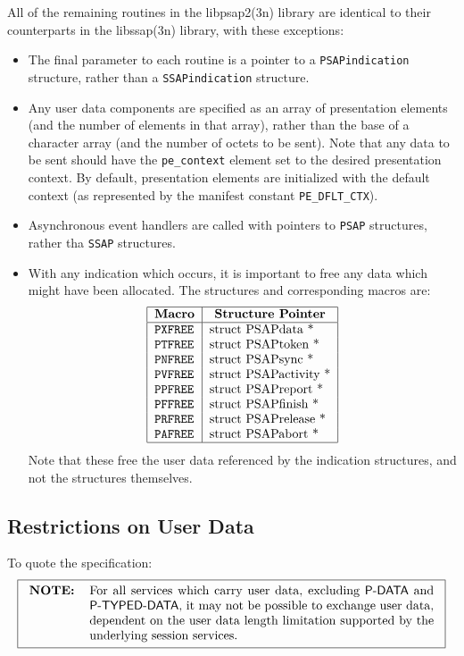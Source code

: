 All of the remaining routines in the \man libpsap2(3n) library are identical
to their counterparts in the \man libssap(3n) library,
with these exceptions:
\begin{itemize}
\item	The final parameter to each routine is a pointer to a
	\verb"PSAPindication" structure,
	rather than a \verb"SSAPindication" structure.

\item	Any user data components are specified as an array of presentation
	elements (and the number of elements in that array),
	rather than the base of a character array (and the number of octets
	to be sent).
	Note that any data to be sent should have the \verb"pe_context"
	element set to the desired presentation context.
	By default, presentation elements are initialized with the
	default context (as represented by the manifest constant
	\verb"PE_DFLT_CTX").

\item	Asynchronous event handlers are called with pointers to \verb"PSAP"
	structures, rather tha \verb"SSAP" structures.

\item	With any indication which occurs,
	it is important to free any data which might have been allocated.
	The structures and corresponding macros are:
\[\begin{tabular}{|l|l|}
\hline
    \multicolumn{1}{|c|}{\bf Macro}&
		\multicolumn{1}{c|}{\bf Structure Pointer}\\
\hline
    \tt	PXFREE&		struct PSAPdata *\\
    \tt	PTFREE&		struct PSAPtoken *\\
    \tt	PNFREE&		struct PSAPsync *\\
    \tt	PVFREE&		struct PSAPactivity *\\
    \tt	PPFREE&		struct PSAPreport *\\
    \tt	PFFREE&		struct PSAPfinish *\\
    \tt	PRFREE&		struct PSAPrelease *\\
    \tt	PAFREE&		struct PSAPabort *\\
\hline
\end{tabular}\]
	Note that these free the user data referenced by the indication
	structures,
	and not the structures themselves.
\end{itemize}

\subsection	{Restrictions on User Data}\label{PSAPdata}
To quote the \cite{ISO.PP.Service} specification:
\[\fbox{\begin{tabular}{lp{0.8\textwidth}}
\bf NOTE:&	For all services which carry user data,
		excluding {\sf P-DATA\/} and {\sf P-TYPED-DATA},
		it may not be possible to exchange user data,
		dependent on the user data length limitation supported by
		the underlying session services.
\end{tabular}}\]

